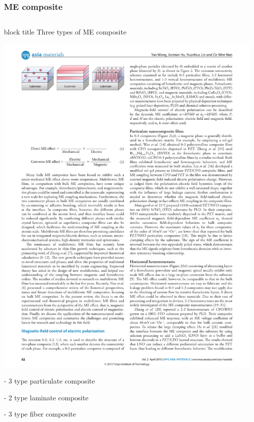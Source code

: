 \documentclass[compress]{beamer}
\begin{document}
\begin{frame}\frametitle{ME composite}
\begin{columns}[totalwidth=\textwidth] 
   \begin{column}{.99\textwidth} 
   \begin{beamercolorbox}[sep=8pt,center]{block title}
      Three types of ME composite
      \end{beamercolorbox}
   \includegraphics[width=0.99\textwidth]{Graphic/01_threetypecomposite.pdf}
   \begin{minipage}{0.32\textwidth}
    - 3 type particulate composite
	\end{minipage}
	\begin{minipage}{0.32\textwidth}
    - 2 type laminate composite
	\end{minipage}
	\begin{minipage}{0.32\textwidth}
    - 3 type fiber composite
	\end{minipage}
   \end{column}
\end{columns}
 \vspace{0.5cm}
\end{frame}
\end{document}
